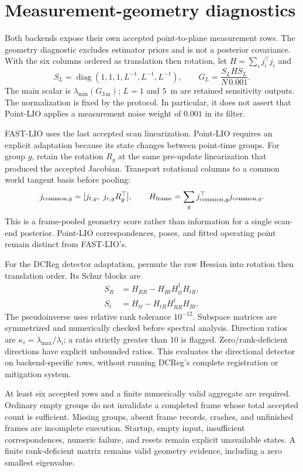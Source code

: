 \documentclass[11pt,a4paper]{article}
\newcommand{\diag}{\operatorname{diag}}
\begin{document}
\section{Measurement-geometry diagnostics}
Both backends expose their own accepted point-to-plane measurement rows.
The geometry diagnostic excludes estimator priors and is not a posterior
covariance. With the six columns ordered as translation then rotation,
let $H=\sum_i j_i^\top j_i$ and
\begin{equation}
 S_L=\diag(1,1,1,L^{-1},L^{-1},L^{-1}),\qquad
 G_L=\frac{S_L H S_L}{N\,0.001}.
\end{equation}
The main scalar is $\lambda_{\min}(G_{3\,\mathrm m})$; $L=1$ and $5$~m are
retained sensitivity outputs. The normalization is fixed by the protocol.
In particular, it does not assert that Point-LIO applies a measurement noise
weight of $0.001$ in its filter.

FAST-LIO uses the last accepted scan linearization. Point-LIO requires an
explicit adaptation because its state changes between point-time groups.
For group $g$, retain the rotation $R_g$ at the same pre-update linearization
that produced the accepted Jacobian. Transport rotational columns to a common
world tangent basis before pooling:
\begin{equation}
 j_{{\rm common},g}=[j_{t,g},\;j_{r,g}R_g^\top],\qquad
 H_{\rm frame}=\sum_g j_{{\rm common},g}^\top j_{{\rm common},g}.
\end{equation}
This is a frame-pooled geometry score rather than information for a single
scan-end posterior. Point-LIO correspondences, poses, and fitted operating
point remain distinct from FAST-LIO's.

For the DCReg detector adaptation, permute the raw Hessian into rotation then
translation order. Its Schur blocks are
\begin{align}
 S_R &= H_{RR}-H_{Rt}H_{tt}^{\dagger}H_{tR},\\
 S_t &= H_{tt}-H_{tR}H_{RR}^{\dagger}H_{Rt}.
\end{align}
The pseudoinverse uses relative rank tolerance $10^{-12}$. Subspace matrices
are symmetrized and numerically checked before spectral analysis. Direction
ratios are $\kappa_i=\lambda_{\max}/\lambda_i$; a ratio strictly greater than
10 is flagged. Zero/rank-deficient directions have explicit unbounded ratios.
This evaluates the directional detector on backend-specific rows, without
running DCReg's complete registration or mitigation system.

At least six accepted rows and a finite numerically valid aggregate are
required. Ordinary empty groups do not invalidate a completed frame whose
total accepted count is sufficient. Missing groups, absent frame records,
crashes, and unfinished frames are incomplete execution. Startup, empty input,
insufficient correspondences, numeric failure, and resets remain explicit
unavailable states. A finite rank-deficient matrix remains valid geometry
evidence, including a zero smallest eigenvalue.
\end{document}

